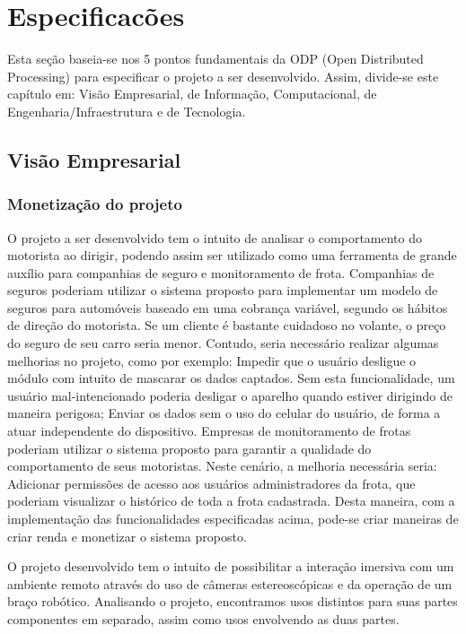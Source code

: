 		\chapter{Especificacões}\label{cap-especificacao}
		
		
	Esta seção baseia-se nos 5 pontos fundamentais da ODP (Open Distributed Processing)
	para especificar o projeto a ser desenvolvido. Assim, divide-se este capítulo em:
	Visão Empresarial, de Informação, Computacional, de Engenharia/Infraestrutura e de
	Tecnologia.
		\section{Visão Empresarial}\label{sec-empresarial}
	\subsection{Monetização do projeto}
	O projeto a ser desenvolvido tem o intuito de analisar o comportamento do motorista
	ao dirigir, podendo assim ser utilizado como uma ferramenta de grande auxílio para
	companhias de seguro e monitoramento de frota.
	Companhias de seguros poderiam utilizar o sistema proposto para implementar
	um modelo de seguros para automóveis baseado em uma cobrança variável, segundo os
	hábitos de direção do motorista. Se um cliente é bastante cuidadoso no volante, o preço
	do seguro de seu carro seria menor. Contudo, seria necessário realizar algumas melhorias
	no projeto, como por exemplo:
	Impedir que o usuário desligue o módulo com intuito de mascarar os dados captados.
	Sem esta funcionalidade, um usuário mal-intencionado poderia desligar o aparelho
	quando estiver dirigindo de maneira perigosa;
	Enviar os dados sem o uso do celular do usuário, de forma a atuar independente do
	dispositivo.
	Empresas de monitoramento de frotas poderiam utilizar o sistema proposto para
	garantir a qualidade do comportamento de seus motoristas. Neste cenário, a melhoria
	necessária seria:
	Adicionar permissões de acesso aos usuários administradores da frota, que poderiam
	visualizar o histórico de toda a frota cadastrada.
	Desta maneira, com a implementação das funcionalidades especificadas acima,
	pode-se criar maneiras de criar renda e monetizar o sistema proposto.
	
	
	
	
	O projeto desenvolvido tem o intuito de possibilitar a interação imersiva com um ambiente remoto através do uso de câmeras estereoscópicas e da operação de um braço robótico. Analisando o projeto, encontramos usos distintos para suas partes componentes em separado, assim como usos envolvendo as duas partes.
	
